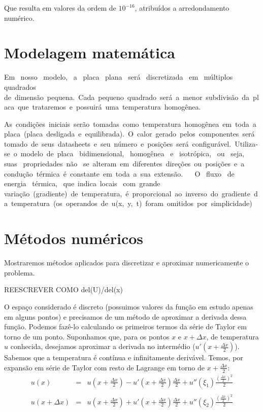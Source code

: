 \documentclass[12pt,fleqn]{article}
\begin{document}


Que resulta em valores da ordem de $10^{-16}$, atribuídos a arredondamento numérico.

\section{Modelagem matemática}
Em  nosso  modelo,  a  placa  plana  será  discretizada  em  múltiplos  quadrados  de dimensão pequena. Cada pequeno quadrado será a menor subdivisão da placa que trataremos e possuirá uma temperatura homogênea.

As condições iniciais serão tomadas como temperatura homogênea em toda a placa (placa desligada e equilibrada). O calor gerado pelos componentes será tomado de seus datasheets e seu número e posições será configurável. Utiliza­se o modelo de placa  bidimensional,  homogênea  e  isotrópica,  ou  seja,  suas  propriedades não  se alteram em diferentes direções ou posições e a  condução térmica é constante em toda a sua extensão. 
 
O  fluxo  de  energia  térmica,  que indica locais  com grande  variação (gradiente) de temperatura, é proporcional ao inverso do gradiente da temperatura (os operandos de u(x, y, t) foram omitidos por simplicidade)

\section{Métodos numéricos}
Mostraremos métodos aplicados para discretizar e aproximar numericamente o problema.

REESCREVER COMO del(U)/del(x)

O espaço considerado é discreto (possuimos valores da função em estudo apenas em alguns pontos) e precisamos de um método de aproximar a derivada dessa função. Podemos fazê-lo calculando os primeiros termos da série de Taylor em torno de um ponto. Suponhamos que, para os pontos $x$ e $x + \Delta x$, de temperatura $u$ conhecida, desejamos aproximar a derivada no intermédio ($u'(x + \frac{\Delta x}{2})$). Sabemos que a temperatura é contínua e infinitamente derivável. Temos, por expansão em série de Taylor com resto de Lagrange em torno de $x + \frac{\Delta x}{2}$:
\begin{equation}
\label{expansao_taylor_derivada}
\begin{array}{rcl}
	u(x) & = & u(x + \frac{\Delta x}{2}) - u'(x + \frac{\Delta x}{2}) \frac{\Delta x}{2} + u''(\xi_1) \frac{(\frac{\Delta x}{2}) ^ 2}{2} \\ \\
	u(x + \Delta x) & = & u(x + \frac{\Delta x}{2}) + u'(x + \frac{\Delta x}{2}) \frac{\Delta x}{2} + u''(\xi_2) \frac{(\frac{\Delta x}{2}) ^ 2}{2}
\end{array}
\end{equation}
\end{document}
